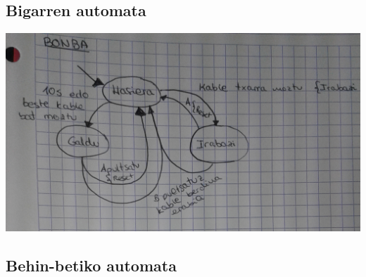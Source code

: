 \documentclass[dvipsnames]{../../../../AritzhClass}
\begin{document}
\subsection{Bigarren automata}

\begin{center}\includegraphics[scale=0.25]{Bonba}\end{center}

\pagebreak

\subsection{Behin-betiko automata}
\end{document}
